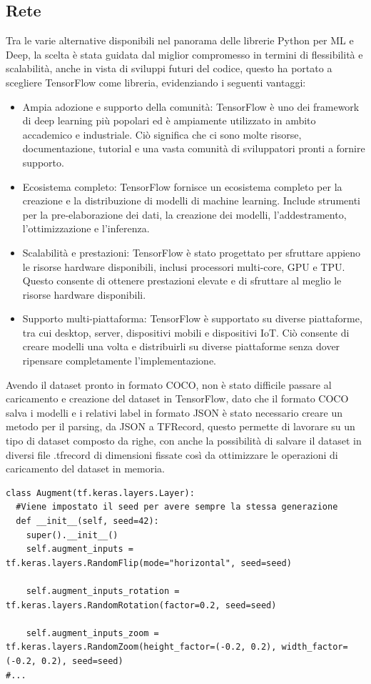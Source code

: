 \documentclass[a4paper,12pt]{report}
\begin{document}
      \subsection{Rete}
      Tra le varie alternative disponibili nel panorama delle librerie Python per ML e Deep,
      la scelta è stata guidata dal miglior compromesso in termini di flessibilità e scalabilità,
      anche in vista di sviluppi futuri del codice, questo ha portato a scegliere
      TensorFlow \cite{tensorflow} come libreria, evidenziando i seguenti vantaggi:
      \begin{itemize}
        \item Ampia adozione e supporto della comunità: TensorFlow è uno dei framework di deep learning più popolari ed è ampiamente utilizzato in ambito accademico e industriale. Ciò significa che ci sono molte risorse, documentazione, tutorial e una vasta comunità di sviluppatori pronti a fornire supporto.
        \item Ecosistema completo: TensorFlow fornisce un ecosistema completo per la creazione e la distribuzione di modelli di machine learning. Include strumenti per la pre-elaborazione dei dati, la creazione dei modelli, l'addestramento, l'ottimizzazione e l'inferenza.
        \item Scalabilità e prestazioni: TensorFlow è stato progettato per sfruttare appieno le risorse hardware disponibili, inclusi processori multi-core, GPU e TPU. Questo consente di ottenere prestazioni elevate e di sfruttare al meglio le risorse hardware disponibili.
        \item Supporto multi-piattaforma: TensorFlow è supportato su diverse piattaforme, tra cui desktop, server, dispositivi mobili e dispositivi IoT. Ciò consente di creare modelli una volta e distribuirli su diverse piattaforme senza dover ripensare completamente l'implementazione.
      \end{itemize}
      \newpage
      Avendo il dataset pronto in formato COCO, non è stato difficile passare al
      caricamento e creazione del dataset in TensorFlow, 
      dato che il formato COCO salva i modelli e i relativi label
      in formato JSON è stato necessario creare un metodo per il 
      parsing, da JSON a TFRecord, questo permette di lavorare su 
      un tipo di dataset composto da righe, con anche la possibilità
      di salvare il dataset in diversi file .tfrecord di dimensioni fissate
      così da ottimizzare le operazioni di caricamento del dataset in memoria. 
      \begin{lstlisting}
class Augment(tf.keras.layers.Layer):
  #Viene impostato il seed per avere sempre la stessa generazione
  def __init__(self, seed=42):
    super().__init__()
    self.augment_inputs = tf.keras.layers.RandomFlip(mode="horizontal", seed=seed)
    
    self.augment_inputs_rotation = tf.keras.layers.RandomRotation(factor=0.2, seed=seed)
    
    self.augment_inputs_zoom = tf.keras.layers.RandomZoom(height_factor=(-0.2, 0.2), width_factor=(-0.2, 0.2), seed=seed)
#...
      \end{lstlisting}
\end{document}
